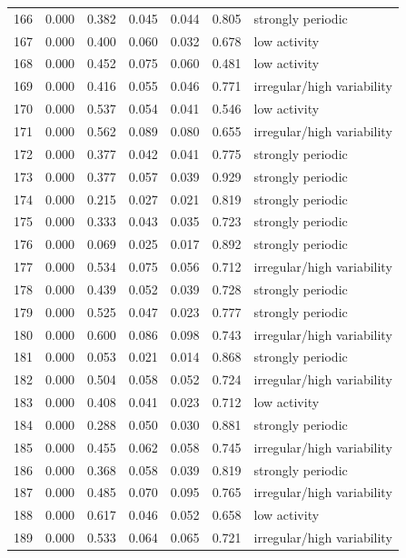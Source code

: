 \begin{longtable}{lrrrrrl}
166 & 0.000 & 0.382 & 0.045 & 0.044 & 0.805 & strongly periodic \\
167 & 0.000 & 0.400 & 0.060 & 0.032 & 0.678 & low activity \\
168 & 0.000 & 0.452 & 0.075 & 0.060 & 0.481 & low activity \\
169 & 0.000 & 0.416 & 0.055 & 0.046 & 0.771 & irregular/high variability \\
170 & 0.000 & 0.537 & 0.054 & 0.041 & 0.546 & low activity \\
171 & 0.000 & 0.562 & 0.089 & 0.080 & 0.655 & irregular/high variability \\
172 & 0.000 & 0.377 & 0.042 & 0.041 & 0.775 & strongly periodic \\
173 & 0.000 & 0.377 & 0.057 & 0.039 & 0.929 & strongly periodic \\
174 & 0.000 & 0.215 & 0.027 & 0.021 & 0.819 & strongly periodic \\
175 & 0.000 & 0.333 & 0.043 & 0.035 & 0.723 & strongly periodic \\
176 & 0.000 & 0.069 & 0.025 & 0.017 & 0.892 & strongly periodic \\
177 & 0.000 & 0.534 & 0.075 & 0.056 & 0.712 & irregular/high variability \\
178 & 0.000 & 0.439 & 0.052 & 0.039 & 0.728 & strongly periodic \\
179 & 0.000 & 0.525 & 0.047 & 0.023 & 0.777 & strongly periodic \\
180 & 0.000 & 0.600 & 0.086 & 0.098 & 0.743 & irregular/high variability \\
181 & 0.000 & 0.053 & 0.021 & 0.014 & 0.868 & strongly periodic \\
182 & 0.000 & 0.504 & 0.058 & 0.052 & 0.724 & irregular/high variability \\
183 & 0.000 & 0.408 & 0.041 & 0.023 & 0.712 & low activity \\
184 & 0.000 & 0.288 & 0.050 & 0.030 & 0.881 & strongly periodic \\
185 & 0.000 & 0.455 & 0.062 & 0.058 & 0.745 & irregular/high variability \\
186 & 0.000 & 0.368 & 0.058 & 0.039 & 0.819 & strongly periodic \\
187 & 0.000 & 0.485 & 0.070 & 0.095 & 0.765 & irregular/high variability \\
188 & 0.000 & 0.617 & 0.046 & 0.052 & 0.658 & low activity \\
189 & 0.000 & 0.533 & 0.064 & 0.065 & 0.721 & irregular/high variability \\

\end{longtable}
